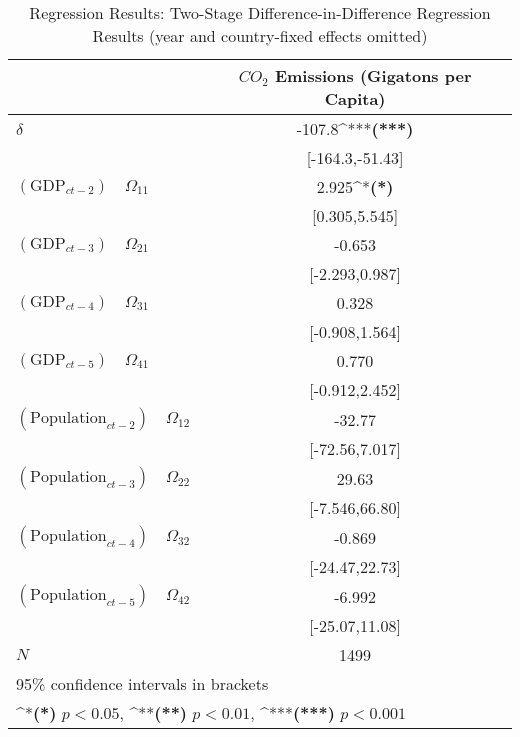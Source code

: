 \newcommand{\sym}[1]{\ifmmode^{#1}\else\textbf{(#1)}\fi}
\begin{center}
    \begin{table}
    \caption{Regression Results: Two-Stage Difference-in-Difference Regression Results (year and country-fixed effects omitted)}
    \begin{tabular}{l*{1}{c}}
    \hline\hline
                &\multicolumn{1}{c}{$CO_2$ Emissions (Gigatons per Capita)} \\
    \hline
    $\delta$&                -107.8\sym{***}\\
        &       [-164.3,-51.43]         \\
    [1em]
    $(\text{GDP}_{ct-2}) \quad \Omega_{11}$   &                 2.925\sym{*}  \\
        &         [0.305,5.545]         \\
    [1em]
    $(\text{GDP}_{ct-3}) \quad \Omega_{21}$   &                -0.653         \\
        &        [-2.293,0.987]         \\
    [1em]
    $(\text{GDP}_{ct-4}) \quad \Omega_{31}$   &                 0.328         \\
        &        [-0.908,1.564]         \\
    [1em]
    $(\text{GDP}_{ct-5}) \quad \Omega_{41}$  &                 0.770         \\
        &        [-0.912,2.452]         \\
    [1em]
    $(\text{Population}_{ct-2}) \quad \Omega_{12}$ &                -32.77         \\
        &        [-72.56,7.017]         \\
    [1em]
    $(\text{Population}_{ct-3}) \quad \Omega_{22}$ &                 29.63         \\
        &        [-7.546,66.80]         \\
    [1em]
    $(\text{Population}_{ct-4}) \quad \Omega_{32}$ &                -0.869         \\
        &        [-24.47,22.73]         \\
    [1em]
    $(\text{Population}_{ct-5}) \quad \Omega_{42}$ &                -6.992         \\
        &        [-25.07,11.08]         \\
    \hline
    \(N\)       &                  1499         \\
    \hline\hline
    \multicolumn{2}{l}{\footnotesize 95\% confidence intervals in brackets}\\
    \multicolumn{2}{l}{\footnotesize \sym{*} \(p<0.05\), \sym{**} \(p<0.01\), \sym{***} \(p<0.001\)}\\    
    \end{tabular}
    \end{table}
    \label{tab:regression_results}
\end{center}